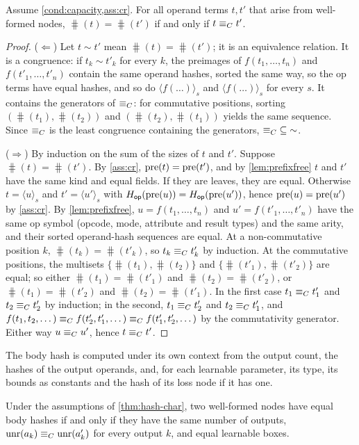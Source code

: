 \begin{theorem}\label{thm:hash-char}
Assume \cref{cond:capacity,ass:cr}. For all operand terms $t,t'$ that arise from well-formed
nodes, $\hash(t)=\hash(t')$ if and only if $t\equiv_{C} t'$.
\end{theorem}
\begin{proof}
($\Leftarrow$) Let $t\sim t'$ mean $\hash(t)=\hash(t')$; it is an equivalence relation. It is a
congruence: if $t_k\sim t'_k$ for every $k$, the preimages of $f(t_1,\dots,t_n)$ and
$f(t'_1,\dots,t'_n)$ contain the same operand hashes, sorted the same way, so the op terms have
equal hashes, and so do $\langle f(\dots)\rangle_s$ and $\langle f(\dots)\rangle_s$ for every
$s$. It contains the generators of $\equiv_{C}$: for commutative positions, sorting
$(\hash(t_1),\hash(t_2))$ and $(\hash(t_2),\hash(t_1))$ yields the same sequence. Since $\equiv_{C}$
is the least congruence containing the generators, ${\equiv_{C}}\subseteq{\sim}$.

($\Rightarrow$) By induction on the sum of the sizes of $t$ and $t'$. Suppose
$\hash(t)=\hash(t')$. By \cref{ass:cr}, $\mathrm{pre}(t)=\mathrm{pre}(t')$, and by \cref{lem:prefixfree} $t$ and
$t'$ have the same kind and equal fields. If they are leaves, they are equal. Otherwise
$t=\langle u\rangle_s$ and $t'=\langle u'\rangle_{s}$ with $H_{\mathsf{op}}(\mathrm{pre}(u))=H_{\mathsf{op}}(\mathrm{pre}(u'))$, hence
$\mathrm{pre}(u)=\mathrm{pre}(u')$ by \cref{ass:cr}. By \cref{lem:prefixfree}, $u=f(t_1,\dots,t_n)$ and
$u'=f(t'_1,\dots,t'_n)$ have the same op symbol (opcode, mode, attribute and result types)
and the same arity, and their sorted operand-hash sequences are equal. At a non-commutative
position $k$, $\hash(t_k)=\hash(t'_k)$, so $t_k\equiv_{C} t'_k$ by induction. At the commutative
positions, the multisets $\{\hash(t_1),\hash(t_2)\}$ and $\{\hash(t'_1),\hash(t'_2)\}$ are
equal; so either $\hash(t_1)=\hash(t'_1)$ and $\hash(t_2)=\hash(t'_2)$, or
$\hash(t_1)=\hash(t'_2)$ and $\hash(t_2)=\hash(t'_1)$. In the first case $t_1\equiv_{C} t'_1$ and
$t_2\equiv_{C} t'_2$ by induction; in the second, $t_1\equiv_{C} t'_2$ and $t_2\equiv_{C} t'_1$, and
$f(t_1,t_2,\dots)\equiv_{C} f(t'_2,t'_1,\dots)\equiv_{C} f(t'_1,t'_2,\dots)$ by the commutativity
generator. Either way $u\equiv_{C} u'$, hence $t\equiv_{C} t'$.
\end{proof}

The body hash is computed under its own context from the output count, the hashes of the
output operands, and, for each learnable parameter, its type, its bounds as constants and the
hash of its loss node if it has one.

\begin{corollary}\label{cor:body}
Under the assumptions of \cref{thm:hash-char}, two well-formed nodes have equal body hashes
if and only if they have the same number of outputs, $\mathrm{unr}(a_k)\equiv_{C}\mathrm{unr}(a'_k)$ for every output
$k$, and equal learnable boxes.
\end{corollary}

